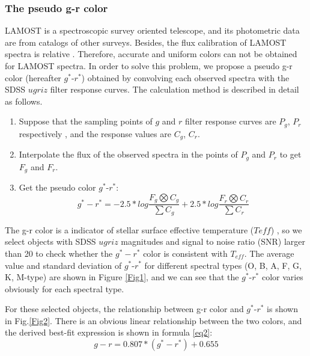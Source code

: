 \documentclass[manuscript]{aastex}
\begin{document}
\subsubsection{The pseudo g-r color}
LAMOST is a spectroscopic survey oriented telescope, and its photometric data are from catalogs of other surveys.
Besides, the flux calibration of LAMOST spectra is relative \citep{bai2012lamost}.
Therefore, accurate and uniform  colors can not be obtained for LAMOST spectra.
In order to solve this problem, we propose a pseudo g-r color (hereafter $g^*$-$r^*$) obtained by convolving each observed spectra with the SDSS $ugriz$ filter response curves.
The calculation method is described in detail  as follows.
\begin{enumerate}
 \item Suppose that the sampling points of   $g$ and $r$ filter response curves are $P_g$, $P_r$ respectively , and the response values are $C_g$, $C_r$.
 \item Interpolate the  flux of the observed spectra in the points of $P_g$ and $P_r$  to get $F_g$ and $F_r$.
 \item Get the pseudo color $g^*$-$r^*$:
 \begin{equation}
        g^*-r^*=-2.5*log\frac{F_g\bigotimes C_g}{\sum C_g} +2.5*log\frac{ F_r\bigotimes C_r}{\sum C_r}
       \end{equation}
\end{enumerate}


The g-r color  is a indicator of stellar surface effective temperature ($Teff$) \citep{lee2008segue,ivezic2008milky},
so we select objects with SDSS $ugriz$ magnitudes and signal to noise ratio (SNR) larger than 20 to check  whether
the $g^*-r^*$  color is consistent with $T_{eff}$.
The average value and standard deviation of $g^*$-$r^*$ for different spectral types (O, B, A, F, G, K, M-type) are shown in Figure \ref{Fig1}, and we can see that the $g^*$-$r^*$ color varies obviously for each spectral type.


For these selected objects, the relationship between g-r color and $g^*$-$r^*$ is  shown in Fig.\ref{Fig2}.
There is an obvious linear relationship between the two colors,
and the derived best-fit expression is shown in formula \ref{eq2}:
\begin{equation}
 g-r=0.807* (g^*-r^*)+  0.655
 \label{eq2}
\end{equation}
\end{document}
